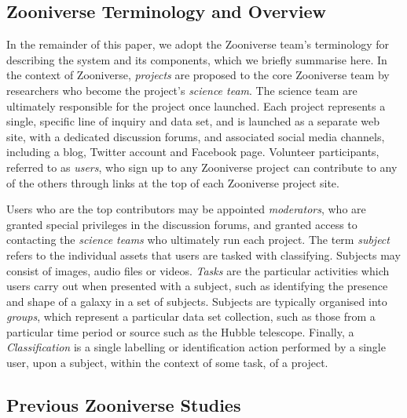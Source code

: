 \documentclass{sigchi}
\begin{document}
\subsection{Zooniverse Terminology and Overview}
In the remainder of this paper, we adopt the Zooniverse team's terminology for describing the system and its components, which we briefly summarise here. In the context of Zooniverse, \emph{projects} are proposed to the core Zooniverse team by researchers who become the project's \emph{science team}.  The science team are ultimately responsible for the project once launched.  Each project represents a single, specific line of inquiry and data set, and is launched as a separate web site, with a dedicated discussion forums,  and associated social media channels, including a blog, Twitter account and Facebook page.  Volunteer participants, referred to as \emph{users}, who sign up to any Zooniverse project can contribute to any of the others through links at the top of each Zooniverse project site.  

Users who are the top contributors may be appointed \emph{moderators}, who are granted special privileges in the discussion forums, and granted access to contacting the \emph{science teams} who ultimately run each project. The term \emph{subject} refers to the individual assets that users are tasked with classifying.  Subjects may consist of images, audio files or videos. \emph{Tasks} are the particular activities which users carry out when presented with a subject, such as identifying the presence and shape of a galaxy in a set of subjects. Subjects are typically organised into \emph{groups}, which represent a particular data set collection, such as those from a particular time period or source such as the Hubble telescope.  Finally, a \emph{Classification} is a single labelling or identification action performed by a single user, upon a subject, within the context of some task, of a project. 

\subsection{Previous Zooniverse Studies}
\end{document}
